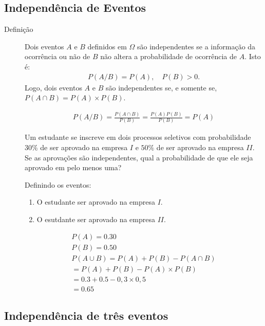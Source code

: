 \begin{description}
  \section{Independência de Eventos}

  \begin{description}
    \item [Definição] Dois eventos $A$ e $B$ definidos em $\Omega$ são independentes se 
      a informação da ocorrência ou não de $B$ não altera a probabilidade de ocorrência
      de $A$. Isto é:
      \begin{align}
        P(A/B)= P(A), \quad        P(B)>0.
      \end{align}
      Logo, dois eventos $A$ e $B$ são independentes se, e somente se, $P(A \cap B)=P(A)\times P(B)$.
      \begin{obs}\begin{align*}
        P(A/B) = \frac{P(A \cap B)}{P(B)} = \frac{P(A)P(B)}{P(B)}= P(A)
      \end{align*}
    \end{obs}
    \begin{example}
     Um estudante se inscreve em dois processos seletivos com probabilidade 
      $30\%$ de ser aprovado na empresa $I$ e $50\%$ de ser aprovado na empresa $II$. Se 
      as aprovações são independentes, qual a probabilidade de que ele seja aprovado em
      pelo menos uma?

      Definindo os eventos:

      \begin{enumerate}[label=\Alph*:]
        \item  O estudante ser aprovado na empresa $I$.
        \item  O esutdante ser aprovado na empresa $II$.
      \end{enumerate}
      \begin{align*}
        P(A)= 0.30\\
        P(B)=0.50\\
        P(A\cup B)= P(A)+P(B)-P(A\cap B)\\
        =P(A)+P(B)-P(A)\times P(B)\\
        =0.3+0.5- 0,3 \times 0,5\\
        =0.65
      \end{align*}
    \end{example}
  \end{description}
  \subsection{Independência de três eventos}


\end{description}
